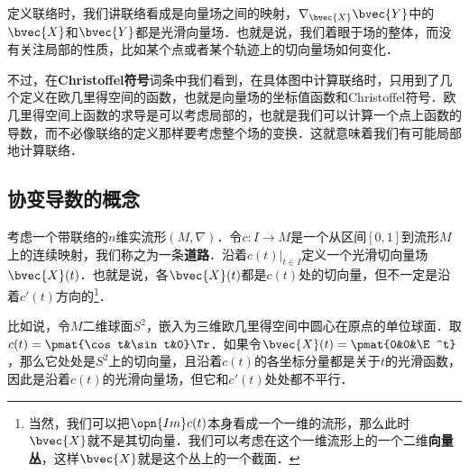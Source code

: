

定义联络时，我们讲联络看成是向量场之间的映射，$\nabla_{\bvec{X}}\bvec{Y}$中的$\bvec{X}$和$\bvec{Y}$都是光滑向量场．也就是说，我们着眼于场的整体，而没有关注局部的性质，比如某个点或者某个轨迹上的切向量场如何变化．

不过，在\textbf{Christoffel符号}词条中我们看到，在具体图中计算联络时，只用到了几个定义在欧几里得空间的函数，也就是向量场的坐标值函数和Christoffel符号．欧几里得空间上函数的求导是可以考虑局部的，也就是我们可以计算一个点上函数的导数，而不必像联络的定义那样要考虑整个场的变换．这就意味着我们有可能局部地计算联络．

\subsection{协变导数的概念}

考虑一个带联络的$n$维实流形$(M, \nabla)$．令$c:I\to M$是一个从区间$[0, 1]$到流形$M$上的连续映射，我们称之为一条\textbf{道路}．沿着$c(t)|_{t\in I}$定义一个光滑切向量场$\bvec{X}(t)$．也就是说，各$\bvec{X}(t)$都是$c(t)$处的切向量，但不一定是沿着$c'(t)$方向的\footnote{当然，我们可以把$\opn{Im}c(t)$本身看成一个一维的流形，那么此时$\bvec{X}$就不是其切向量．我们可以考虑在这个一维流形上的一个二维\textbf{向量丛}，这样$\bvec{X}$就是这个丛上的一个截面．}．

比如说，令$M$二维球面$S^2$，嵌入为三维欧几里得空间中圆心在原点的单位球面．取$c(t)=\pmat{\cos t&\sin t&0}\Tr$．如果令$\bvec{X}(t)=\pmat{0&0&\E^t}$，那么它处处是$S^2$上的切向量，且沿着$c(t)$的各坐标分量都是关于$t$的光滑函数，因此是沿着$c(t)$的光滑向量场，但它和$c'(t)$处处都不平行．




